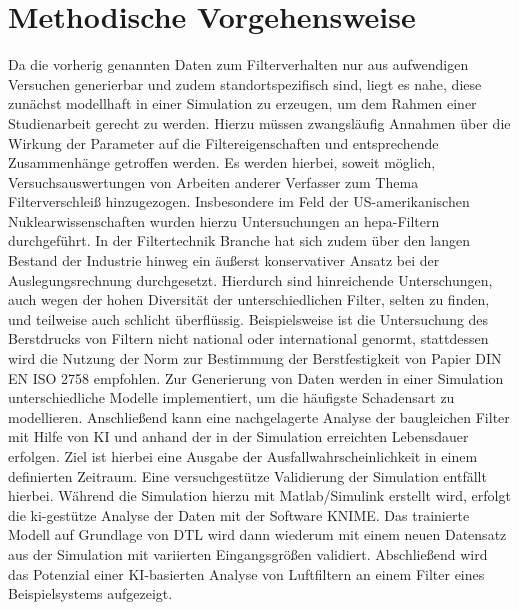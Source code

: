     \section{Methodische Vorgehensweise}
    Da die vorherig genannten Daten zum Filterverhalten nur aus aufwendigen Versuchen generierbar und zudem standortspezifisch sind, liegt es nahe, diese zunächst modellhaft in einer Simulation zu erzeugen, um dem Rahmen einer Studienarbeit gerecht zu werden. Hierzu müssen zwangsläufig Annahmen über die Wirkung der Parameter auf die Filtereigenschaften und entsprechende Zusammenhänge getroffen werden. Es werden hierbei, soweit möglich, Versuchsauswertungen von Arbeiten anderer Verfasser zum Thema Filterverschleiß hinzugezogen. Insbesondere im Feld der US-amerikanischen Nuklearwissenschaften wurden hierzu Untersuchungen an \ac{hepa}-Filtern durchgeführt. In der Filtertechnik Branche hat sich zudem über den langen Bestand der Industrie hinweg ein äußerst konservativer Ansatz bei der Auslegungsrechnung durchgesetzt. Hierdurch sind hinreichende Unterschungen, auch wegen der hohen Diversität der unterschiedlichen Filter, selten zu finden, und teilweise auch schlicht überflüssig. Beispielsweise ist die Untersuchung des Berstdrucks von Filtern nicht national oder international genormt, stattdessen wird die Nutzung der Norm zur Bestimmung der Berstfestigkeit von Papier DIN EN ISO 2758 \cite{2758} empfohlen. \newline
    Zur Generierung von Daten werden in einer Simulation unterschiedliche Modelle implementiert, um die häufigste Schadensart zu modellieren. Anschließend kann eine nachgelagerte Analyse der baugleichen Filter mit Hilfe von KI und anhand der in der Simulation erreichten Lebensdauer erfolgen. Ziel ist hierbei eine Ausgabe der Ausfallwahrscheinlichkeit in einem definierten Zeitraum. Eine versuchgestütze Validierung der Simulation entfällt hierbei.\newline
    Während die Simulation hierzu mit Matlab/Simulink erstellt wird, erfolgt die \ac{ki}-gestütze Analyse der Daten mit der Software \ac{KNIME}. Das trainierte Modell auf Grundlage von \ac{DTL} wird dann wiederum mit einem neuen Datensatz aus der Simulation mit variierten Eingangsgrößen validiert. Abschließend wird das Potenzial einer KI-basierten Analyse von Luftfiltern an einem Filter eines Beispielsystems aufgezeigt.
